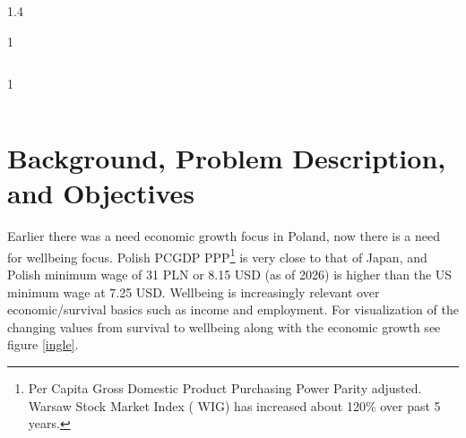 \documentclass[10pt, letterpaper]{article}
\begin{document}
\begin{spacing}{1.4}
\begin{scriptsize}
\begin{spacing}{1}
\begin{verbatim}
\end{verbatim}
\end{spacing}
\end{scriptsize}


\begin{scriptsize}
\begin{spacing}{1} 
\begin{verbatim}

\end{verbatim}
\end{spacing}
\end{scriptsize}

\newpage
\section{Background, Problem Description, and Objectives}

Earlier there was a need economic growth focus in Poland, now
 there is a need for wellbeing focus. 
  Polish PCGDP PPP\footnote{Per Capita Gross Domestic Product Purchasing Power
    Parity adjusted.  %
  Warsaw Stock Market Index (%
  WIG) has increased about 120\% over past 5 years.
} 
is very close to that of Japan, and Polish minimum wage of 31 PLN or 8.15 USD
(as of 2026) is higher than the US minimum wage at 7.25 USD.  
%
Wellbeing is increasingly relevant over economic/survival basics such as income and
 employment. 
For visualization of the changing values from survival to wellbeing along with
the economic growth see figure \ref{ingle}.  


\end{spacing}
\end{document}
